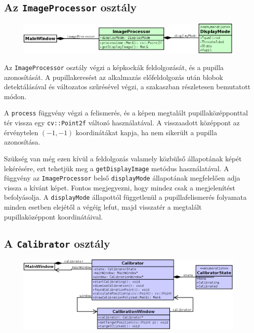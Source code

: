 \subsection{Az \texttt{ImageProcessor} osztály}\label{sect:imageprocessor}

\begin{figure}[!ht]
\centering
\includegraphics[width=140mm, keepaspectratio]{figures/class_imageprocessor.png}
\end{figure}

Az \texttt{ImageProcessor} osztály végzi a képkockák feldolgozását, és a pupilla azonosítását. A pupillakeresést az alkalmazás előfeldolgozás után blobok detektálásával és változatos szűrésével végzi, a  szakaszban részletesen bemutatott módon.

A \texttt{process} függvény végzi a felismerés, és a képen megtalált pupillaközépponttal tér vissza egy \texttt{cv::Point2f} változó használatával. A visszaadott középpont az érvénytelen $(-1, -1)$ koordinátákat kapja, ha nem sikerült a pupilla azonosítása.

Szükség van még ezen kívül a feldolgozás valamely közbülső állapotának képét lekérésére, ezt tehetjük meg a \texttt{getDisplayImage} metódus használatával. A függvény az \texttt{ImageProcessor} belső \texttt{displayMode} állapotának megfelelően adja vissza a kívánt képet. Fontos megjegyezni, hogy mindez csak a megjelenítést befolyásolja. A \texttt{displayMode} állapottól függetlenül a pupillafelismerés folyamata minden esetben elejétől a végéig lefut, majd visszatér a megtalált pupillaközéppont koordinátáival.
 
\subsection{A \texttt{Calibrator} osztály}\label{sect:calibrator}

\begin{figure}[!ht]
\centering
\includegraphics[width=140mm, keepaspectratio]{figures/class_calibrator.png}
\end{figure}

